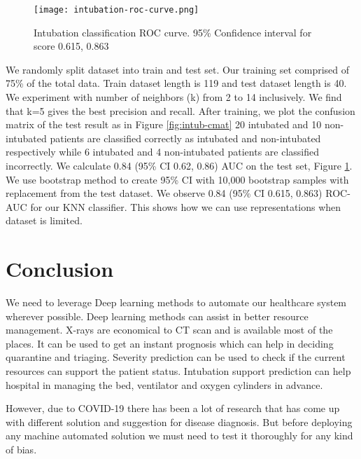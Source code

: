 \documentclass[a4paper]{article}
\begin{document}
\begin{figure}[h]
\centering
\texttt{[image: intubation-roc-curve.png]}
\caption{\label{fig:intubation-auc-curve}Intubation classification ROC curve. 95\% Confidence interval for score 0.615, 0.863}
\end{figure}

We randomly split dataset into train and test set. Our training set comprised of 75\% of the total data. Train dataset length is 119 and test dataset length is 40.
We experiment with number of neighbors (k) from 2 to 14 inclusively. We find that k=5 gives the best precision and recall.
After training, we plot the confusion matrix of the test result as in Figure \ref{fig:intub-cmat}
20 intubated and 10 non-intubated patients are classified correctly as intubated and non-intubated respectively while 6 intubated and 4 non-intubated patients are classified incorrectly.
We calculate 0.84 (95\% CI 0.62, 0.86) AUC on the test set, Figure \ref{fig:intubation-auc-curve}.
We use bootstrap method to create 95\% CI with 10,000 bootstrap samples with replacement from the test dataset. We observe 0.84 (95\% CI 0.615, 0.863) ROC-AUC for our KNN classifier.
This shows how we can use representations when dataset is limited.


\section{Conclusion}
We need to leverage Deep learning methods to automate our healthcare system wherever possible. Deep learning methods can assist in better resource management.
X-rays are economical to CT scan and is available most of the places. It can be used to get an instant prognosis which can help in deciding quarantine and triaging.
Severity prediction can be used to check if the current resources can support the patient status. Intubation support prediction can help hospital in managing the bed, ventilator and oxygen cylinders in advance.

However, due to COVID-19 there has been a lot of research that has come up with different solution and suggestion for disease diagnosis. But before deploying any machine automated solution we must need to test it thoroughly for any kind of bias.








\end{document}
